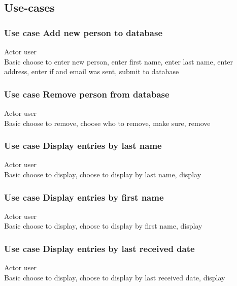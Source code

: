 \documentclass{article}
\begin{document}


\subsection{Use-cases}
\subsubsection*{Use case Add new person to database}
Actor user \\
Basic choose to enter new person, enter first name, enter last name, enter address, enter if and email was sent, submit to database \\

\subsubsection*{Use case Remove person from database}
Actor user \\
Basic choose to remove, choose who to remove, make sure, remove \\
 
\subsubsection*{Use case Display entries by last name}
Actor user \\
Basic choose to display, choose to display by last name, display \\
 
\subsubsection*{Use case Display entries by first name}
Actor user \\
Basic choose to display, choose to display by first name, display \\
 
\subsubsection*{Use case Display entries by last received date}
Actor user \\
Basic choose to display, choose to display by last received date, display \\
\end{document}
